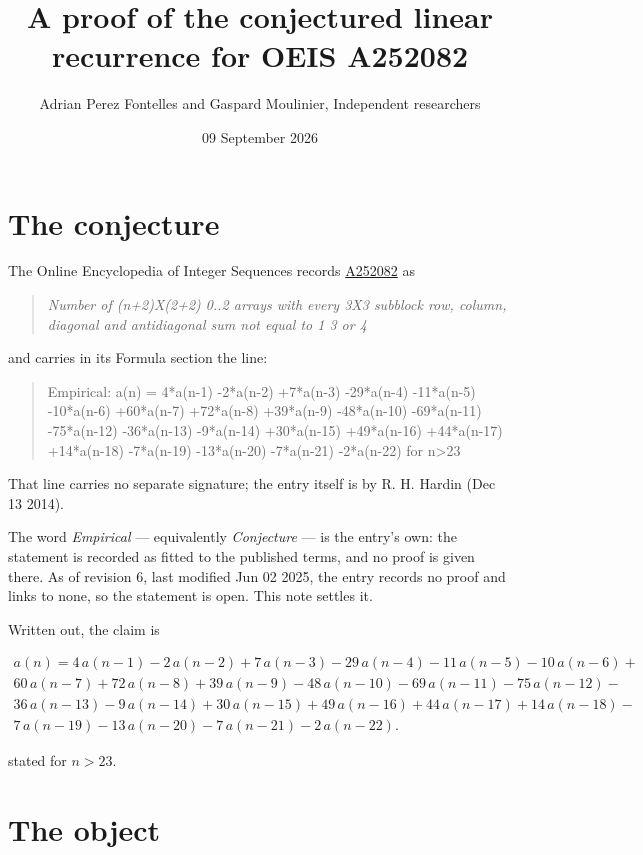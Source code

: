 \documentclass[11pt]{article}
\title{A proof of the conjectured linear recurrence for OEIS A252082}
\author{Adrian Perez Fontelles and Gaspard Moulinier, Independent researchers}
\date{09 September 2026}
\theoremstyle{definition}
\begin{document}
\maketitle
\section{The conjecture}

The Online Encyclopedia of Integer Sequences records \href{https://oeis.org/A252082}{A252082} as

\begin{quote}\itshape Number of (n+2)X(2+2) 0..2 arrays with every 3X3 subblock row, column, diagonal and antidiagonal sum not equal to 1 3 or 4\end{quote}

and carries in its Formula section the line:

\begin{quote}\ttfamily Empirical: a(n) = 4*a(n-1) -2*a(n-2) +7*a(n-3) -29*a(n-4) -11*a(n-5) -10*a(n-6) +60*a(n-7) +72*a(n-8) +39*a(n-9) -48*a(n-10) -69*a(n-11) -75*a(n-12) -36*a(n-13) -9*a(n-14) +30*a(n-15) +49*a(n-16) +44*a(n-17) +14*a(n-18) -7*a(n-19) -13*a(n-20) -7*a(n-21) -2*a(n-22) for n>23\end{quote}

That line carries no separate signature; the entry itself is by R. H. Hardin (Dec 13 2014).

The word {\itshape Empirical} --- equivalently {\itshape Conjecture} --- is the entry's own: the statement is recorded as fitted to the published terms, and no proof is given there. As of revision 6, last modified Jun 02 2025, the entry records no proof and links to none, so the statement is open. This note settles it.

Written out, the claim is

\begin{multline*} a(n) = 4\,a(n-1) - 2\,a(n-2) + 7\,a(n-3) - 29\,a(n-4) - 11\,a(n-5) - 10\,a(n-6) + \\ 60\,a(n-7) + 72\,a(n-8) + 39\,a(n-9) - 48\,a(n-10) - 69\,a(n-11) - 75\,a(n-12) - \\ 36\,a(n-13) - 9\,a(n-14) + 30\,a(n-15) + 49\,a(n-16) + 44\,a(n-17) + 14\,a(n-18) - \\ 7\,a(n-19) - 13\,a(n-20) - 7\,a(n-21) - 2\,a(n-22). \end{multline*}

stated for $n > 23$.

\section{The object}
\end{document}
